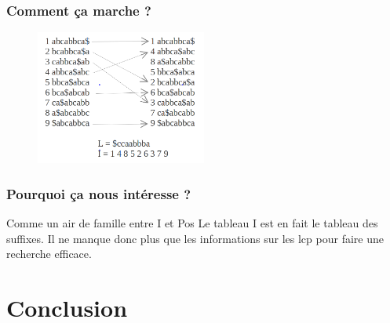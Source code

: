 \documentclass[10pt]{beamer}
\begin{document}
\begin{frame}
  \frametitle{Comment ça marche ?}
  \begin{figure}
    \includegraphics[width=0.5\textwidth]{full_burrows}
  \end{figure}

\end{frame}

\begin{frame}
  \frametitle{Pourquoi ça nous intéresse ?}

  \begin{block}{Comme un air de famille entre I et Pos}
    Le tableau I est en fait le tableau des suffixes.
    Il ne manque donc plus que les informations sur les lcp pour faire
    une recherche efficace.
  \end{block}

\end{frame}





\section{Conclusion}
\label{sec:conclusion}
\end{document}
